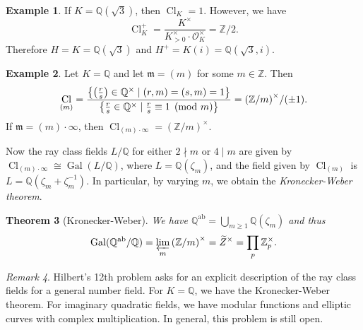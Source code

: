 \documentclass[leqno, openany]{memoir}
\newtheorem{thm}{Theorem}[section]
\theoremstyle{definition}
\newtheorem{exm}[thm]{Example}
\theoremstyle{remark}
\newtheorem{rmk}[thm]{Remark}
\theoremstyle{plain}
\theoremstyle{definition}
\theoremstyle{remark}
\newcommand{\Z}{\mathbb{Z}}
\newcommand{\Q}{\mathbb{Q}}
\newcommand{\mc}[1]{\mathcal{#1}}
\newcommand{\mf}[1]{\mathfrak{#1}}
\newcommand{\mr}[1]{\mathrm{#1}}
\newcommand{\wt}[1]{\widetilde{#1}}
\DeclareMathOperator{\Gal}{Gal}
\DeclareMathOperator{\Cl}{Cl}
\begin{document}
\begin{exm} If $K = \Q(\sqrt{3})$, then $\Cl_K = \qty{1}$. However, we have \[
\Cl_K^+ = \frac{K^{\times}}{K_{>0}^{\times} \cdot \mc{O}_K^{\times}} = \Z/2. \]
Therefore $H = K = \Q(\sqrt{3})$ and $H^+ = K(i) = \Q(\sqrt{3}, i)$.  \end{exm}

\begin{exm} Let $K = \Q$ and let $\mf{m} = (m)$ for some $m \in \Z$. Then \[
\Cl_{(m)} = \frac{\qty{\qty(\frac{r}{s}) \in \Q^{\times} \mid (r,m) = (s,m) =
1}}{\qty{\frac{r}{s} \in \Q^{\times} \mid \frac{r}{s} \equiv 1 \pmod m}} =
{(\Z/m)}^{\times} / (\pm 1). \] If $\mf{m} = (m) \cdot \infty$, then $\Cl_{(m)
\cdot \infty} = {(\Z/m)}^{\times}$.

    Now the ray class fields $L/\Q$ for either $2 \nmid m$ or $4 \mid m$ are
given by $\Cl_{(m) \cdot \infty} \cong \Gal(L/\Q)$, where $L = \Q(\zeta_m)$,
and the field given by $\Cl_{(m)}$ is $L = \Q(\zeta_m + \zeta_m^{-1})$. In
particular, by varying $m$, we obtain the \textit{Kronecker-Weber theorem}.
\end{exm}

\begin{thm}[Kronecker-Weber] We have $\Q^{\mr{ab}} = \bigcup_{m \geq 1}
    \Q(\zeta_m)$ and thus \[ \Gal(\Q^{\mr{ab}}/\Q) = \varprojlim_m
    {(\Z/m)}^{\times} = \wt{Z}^{\times} = \prod_p \Z_p^{\times}. \] \end{thm}

\begin{rmk} Hilbert's 12th problem asks for an explicit description of the ray
    class fields for a general number field. For $K = \Q$, we have the
    Kronecker-Weber theorem. For imaginary quadratic fields, we have modular
    functions and elliptic curves with complex multiplication. In general, this
    problem is still open.  \end{rmk}
\end{document}
